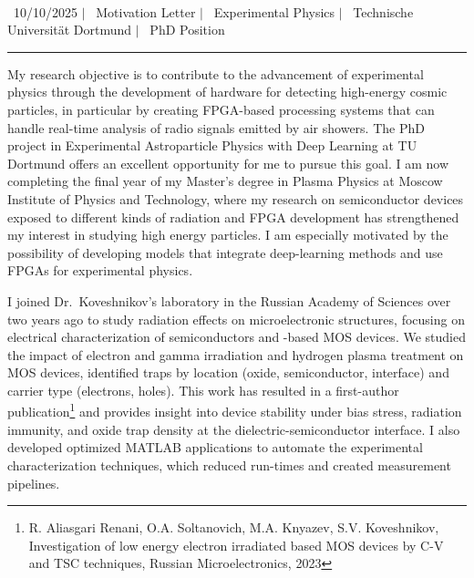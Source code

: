 \documentclass[a4paper,12pt]{article}
\begin{document}
\begin{center}
    {\Huge \scshape {\fontsize{25}{30}\selectfont{Reza}} {\fontsize{25}{30}}} \\ \vspace{3pt}
    {\small \raisebox{-0.2\height}\ {10/10/2025}} $|$
    {\small \raisebox{-0.2\height}\ {Motivation Letter}} $|$
    {\small \raisebox{-0.2\height}\ {Experimental Physics}} $|$
    {\small \raisebox{-0.2\height}\ {Technische Universität Dortmund}} $|$
    {\small \raisebox{-0.2\height}\ {PhD Position}}
    \vspace{-10pt}
\end{center}
\vspace{-10pt}
\noindent\rule{\textwidth}{0.5pt}

My research objective is to contribute to the advancement of experimental physics through the development of hardware for detecting high-energy cosmic particles, in particular by creating FPGA-based processing systems that can handle real-time analysis of radio signals emitted by air showers. The PhD project in Experimental Astroparticle Physics with Deep Learning at TU Dortmund offers an excellent opportunity for me to pursue this goal. I am now completing the final year of my Master’s degree in Plasma Physics at Moscow Institute of Physics and Technology, where my research on semiconductor devices exposed to different kinds of radiation and FPGA development has strengthened my interest in studying high energy particles. I am especially motivated by the possibility of developing models that integrate deep-learning methods and use FPGAs for experimental physics.

\vspace{10pt}
I joined Dr.\ Koveshnikov's laboratory in the Russian Academy of Sciences over two years ago to study radiation effects on microelectronic structures, focusing on electrical characterization of semiconductors and -based MOS devices. We studied the impact of electron and gamma irradiation and hydrogen plasma treatment on MOS devices, identified traps by location (oxide, semiconductor, interface) and carrier type (electrons, holes). This work has resulted in a first-author publication\footnote{R. Aliasgari Renani, O.A. Soltanovich, M.A. Knyazev, S.V. Koveshnikov, Investigation of low energy electron irradiated  based MOS devices by C-V and TSC techniques, Russian Microelectronics, 2023} and provides insight into device stability under bias stress, radiation immunity, and oxide trap density at the dielectric-semiconductor interface. I also developed optimized MATLAB applications to automate the experimental characterization techniques, which reduced run-times and created measurement pipelines. 
\end{document}
